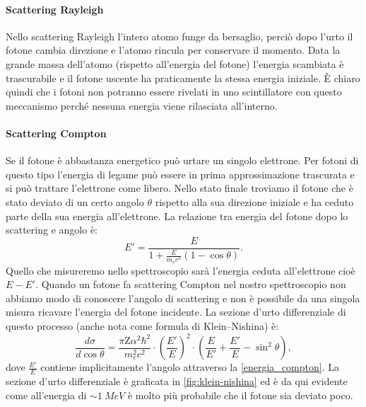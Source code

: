  \paragraph{Scattering Rayleigh}
 Nello scattering Rayleigh l'intero atomo funge da bersaglio, perciò dopo l'urto il fotone cambia direzione e l'atomo rincula per conservare il momento. Data la grande massa dell'atomo (rispetto all'energia del fotone) l'energia scambiata è trascurabile e il fotone uscente ha praticamente la stessa energia iniziale. \`E chiaro quindi che i fotoni non potranno essere rivelati in uno scintillatore con questo meccanismo perché nessuna energia viene rilasciata all'interno.
 
 \paragraph{Scattering Compton}
 Se il fotone è abbastanza energetico può urtare un singolo elettrone. Per fotoni di questo tipo l'energia di legame può essere in prima approssimazione trascurata e si può trattare l'elettrone come libero. Nello stato finale troviamo il fotone che è stato deviato di un certo angolo $\theta$ rispetto alla sua direzione iniziale e ha ceduto parte della sua energia all'elettrone. La relazione tra energia del fotone dopo lo scattering e angolo è:
 \begin{equation}
 \label{energia_compton} 
 E' = \frac{E}{1+\frac{E}{m_ec^2}(1-\cos{\theta})}.
 \end{equation}
 Quello che misureremo nello spettroscopio sarà l'energia ceduta all'elettrone cioè $E-E'$. Quando un fotone fa scattering Compton nel nostro spettroscopio non abbiamo modo di conoscere l'angolo di scattering e non è possibile da una singola misura ricavare l'energia del fotone incidente.
 La sezione d'urto differenziale di questo processo (anche nota come formula di Klein–Nishina) è:
 \begin{equation}
 \label{klein-nishina}
 \frac{d\sigma}{d\cos{\theta}} = \frac{\pi\text{Z}\alpha^2\hbar^2}{m_e^2c^2} \cdot\left(\frac{E'}{E}\right)^2 \cdot \left(\frac{E}{E'} + \frac{E'}{E} - \sin^2{\theta}\right),
 \end{equation}
 dove $\frac{E'}{E}$ contiene implicitamente l'angolo attraverso la \eqref{energia_compton}.
 La sezione d'urto differenziale è graficata in \autoref{fig:klein-nishina}
 ed è da qui evidente come all'energia di $\sim \SI{1}{MeV}$ è molto più probabile che il fotone sia deviato poco. 
 
